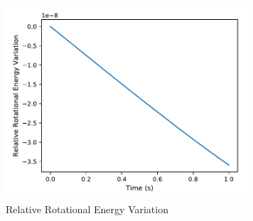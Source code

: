 \documentclass[]{BasiliskReportMemo}
\begin{document}
\begin{figure}[h]
		\centering
		\includegraphics[width=9cm]{Figures/RE_Dtime00001s.pdf}
		\caption{Relative Rotational Energy Variation}
		\label{fig:RED0001s}
	\end{figure}
\end{document}
